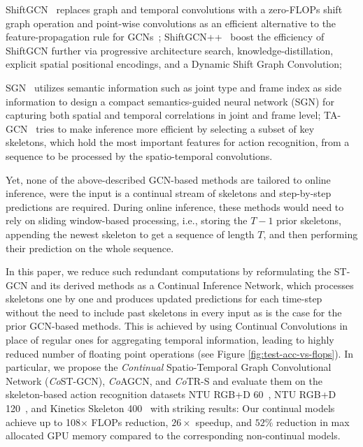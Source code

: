 \documentclass[journal]{IEEEtran}
\theoremstyle{definition}
\begin{document}
ShiftGCN~\cite{cheng2020skeleton} replaces graph and temporal convolutions with a zero-FLOPs shift graph operation and point-wise convolutions as an efficient alternative to the feature-propagation rule for GCNs~\cite{kipf2016semi}; 
ShiftGCN++~\cite{cheng2021extremely} boost the efficiency of ShiftGCN further via progressive architecture search, knowledge-distillation, explicit spatial positional encodings, and a Dynamic Shift Graph Convolution; 

SGN~\cite{zhang2020semantics} utilizes semantic information such as joint type and frame index as side information to design a compact semantics-guided neural network (SGN) for capturing both spatial and temporal correlations in joint and frame level; 
TA-GCN~\cite{negarTAGCN} tries to make inference more efficient by selecting a subset of key skeletons, which hold the most important features for action recognition, from a sequence to be processed by the spatio-temporal convolutions. 


Yet, none of the above-described GCN-based methods are tailored to online inference, were the input is a continual stream of skeletons and step-by-step predictions are required. 
During online inference, these methods would need to rely on sliding window-based processing, i.e., storing the $T-1$ prior skeletons, appending the newest skeleton to get a sequence of length $T$, and then performing their prediction on the whole sequence. 

In this paper, we reduce such redundant computations by reformulating the ST-GCN and its derived methods as a Continual Inference Network, which processes skeletons one by one and produces updated predictions for each time-step without the need to include past skeletons in every input as is the case for the prior GCN-based methods. 
This is achieved by using Continual Convolutions in place of regular ones for aggregating temporal information, leading to highly reduced number of floating point operations (see Figure \ref{fig:test-acc-vs-flops}). 
In particular, we propose the \textit{Continual} Spatio-Temporal Graph Convolutional Network (\textit{Co}ST-GCN), \textit{Co}AGCN, and \textit{Co}TR-S and evaluate them on the skeleton-based action recognition datasets NTU RGB+D 60~\cite{Shahroudy_2016_NTURGBD}, NTU RGB+D 120~\cite{Liu_2019_NTURGBD120}, and Kinetics Skeleton 400~\cite{kay2017kinetics} with striking results: Our continual models achieve up to 108$\times$ FLOPs reduction, $26\times$ speedup, and $52\%$ reduction in max allocated GPU memory compared to the corresponding non-continual models.
\end{document}
